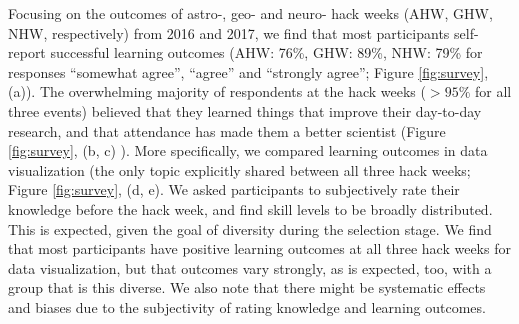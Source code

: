 
Focusing on the outcomes of astro-, geo- and neuro- hack weeks (AHW, GHW, NHW, respectively) from 2016 and 2017, we find that most participants self-report successful learning outcomes (AHW: 76\%, GHW: 89\%, NHW: 79\% for responses ``somewhat agree'', ``agree'' and ``strongly agree''; Figure \ref{fig:survey}, (a)).
The overwhelming majority of respondents at the hack weeks ($>95\%$ for all three events) believed that they learned things that improve their day-to-day research, and that attendance has made them a better scientist (Figure \ref{fig:survey}, (b, c) ).
More specifically, we compared learning outcomes in data visualization (the only topic explicitly shared between all three hack weeks; Figure \ref{fig:survey}, (d, e). We asked participants to subjectively rate their knowledge before the hack week, and find skill levels to be broadly distributed. This is expected, given the goal of diversity during the selection stage. We find that most participants have positive learning outcomes at all three hack weeks for data visualization, but that outcomes vary strongly, as is expected, too, with a group that is this diverse. We also note that there might be systematic effects and biases due to the subjectivity of rating knowledge and learning outcomes.


